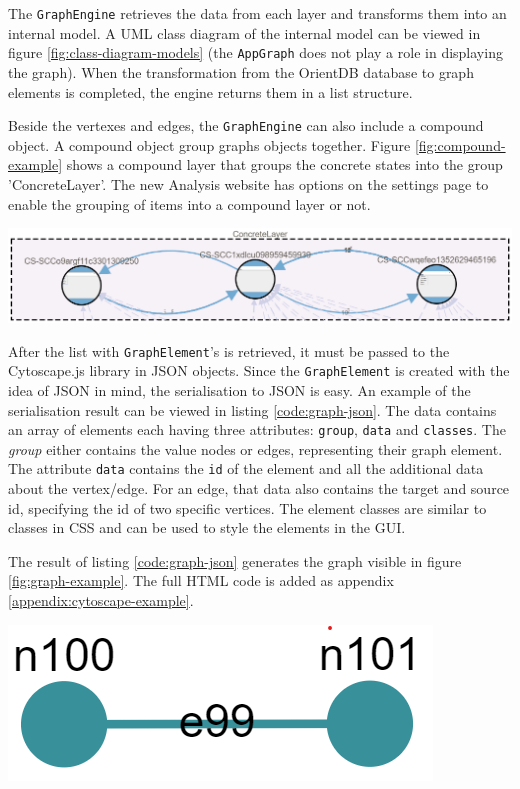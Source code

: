The \verb|GraphEngine| retrieves the data from each layer and transforms them into an internal model. A UML class diagram of the internal model can be viewed in figure \ref{fig:class-diagram-models} (the \verb|AppGraph| does not play a role in displaying the graph). When the transformation from the OrientDB database to graph elements is completed, the engine returns them in a list structure. 

Beside the vertexes and edges, the \verb|GraphEngine| can also include a compound object. A compound object group graphs objects together. Figure \ref{fig:compound-example} shows a compound layer that groups the concrete states into the group 'ConcreteLayer'. The new Analysis website has options on the settings page to enable the grouping of items into a compound layer or not.

\begingroup
\captionsetup{type=figure}
\includegraphics[scale=0.6]{content/5-Results/Images/compound-layer.png}
\label{fig:compound-example}
\endgroup

After the list with \verb|GraphElement|'s is retrieved, it must be passed to the Cytoscape.js library in JSON objects. Since the \verb|GraphElement| is created with the idea of JSON in mind, the serialisation to JSON is easy. An example of the serialisation result can be viewed in listing \ref{code:graph-json}. The data contains an array of elements each having three attributes: \verb|group|, \verb|data| and \verb|classes|. The \textit{group} either contains the value nodes or edges, representing their graph element. The attribute \verb|data| contains the \verb|id| of the element and all the additional data about the vertex/edge. For an edge, that data also contains the target and source id, specifying the id of two specific vertices. The element classes are similar to classes in \textsc{CSS} and can be used to style the elements in the GUI. 

The result of listing \ref{code:graph-json} generates the graph visible in figure \ref{fig:graph-example}. The full HTML code is added as appendix \ref{appendix:cytoscape-example}. 

\begingroup
\captionsetup{type=figure}
\includegraphics[scale=0.6]{content/5-Results/Images/graph-example.png}
\label{fig:graph-example}
\endgroup

